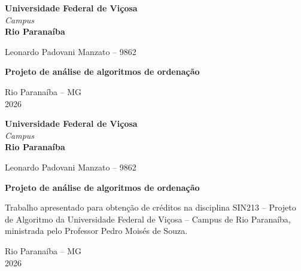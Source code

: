 \documentclass[12pt,a4paper]{article}
\author{Leonardo Padovani Manzato}
\begin{document}

\begin{titlepage}
    \begin{center}
        \textbf{Universidade Federal de Viçosa}\\
        \textit{Campus}\\
        \textbf{Rio Paranaíba}

        \vspace{4cm}

        Leonardo Padovani Manzato -- 9862

        \vspace{5cm}

        \textbf{Projeto de análise de algoritmos de ordenação}

        \vfill

        Rio Paranaíba -- MG\\
        2026
    \end{center}
\end{titlepage}


\begin{titlepage}
    \begin{center}
        \textbf{Universidade Federal de Viçosa}\\
        \textit{Campus}\\
        \textbf{Rio Paranaíba}

        \vspace{3cm}

        Leonardo Padovani Manzato -- 9862

        \vspace{4cm}

        \textbf{Projeto de análise de algoritmos de ordenação}

        \vspace{3cm}

        \begin{flushright}
            \begin{minipage}{0.5\textwidth}
                Trabalho apresentado para obtenção de créditos na
                disciplina SIN213 -- Projeto de Algoritmo da Universidade
                Federal de Viçosa -- Campus de Rio Paranaíba, ministrada
                pelo Professor Pedro Moisés de Souza.
            \end{minipage}
        \end{flushright}

        \vfill

        Rio Paranaíba -- MG\\
        2026
    \end{center}
\end{titlepage}
\end{document}

